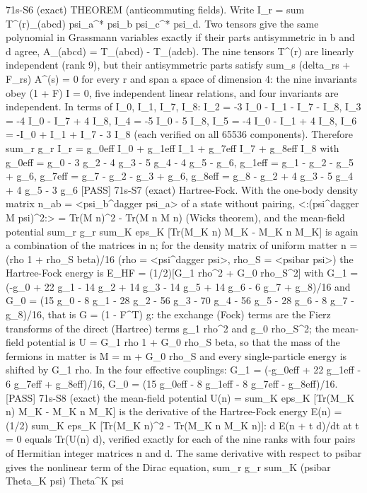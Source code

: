 \documentclass[
  10pt,
]{article}
\newenvironment{Shaded}{}{}
\newcommand{\NormalTok}[1]{#1}
\begin{document}
\begin{Shaded}
\begin{Highlighting}[]
\NormalTok{[PASS] 71s{-}S6  (exact) THEOREM (anticommuting fields). Write I\_r = sum T\^{}(r)\_(abcd) psi\_a\^{}* psi\_b psi\_c\^{}* psi\_d. Two tensors give the same polynomial in Grassmann variables exactly if their parts antisymmetric in b and d agree, A\_(abcd) = T\_(abcd) {-} T\_(adcb). The nine tensors T\^{}(r) are linearly independent (rank 9), but their antisymmetric parts satisfy sum\_s (delta\_rs + F\_rs) A\^{}(s) = 0 for every r and span a space of dimension 4: the nine invariants obey (1 + F) I = 0, five independent linear relations, and four invariants are independent. In terms of I\_0, I\_1, I\_7, I\_8: I\_2 = {-}3 I\_0 {-} I\_1 {-} I\_7 {-} I\_8, I\_3 = {-}4 I\_0 {-} I\_7 + 4 I\_8, I\_4 = {-}5 I\_0 {-} 5 I\_8, I\_5 = {-}4 I\_0 {-} I\_1 + 4 I\_8, I\_6 = {-}I\_0 + I\_1 + I\_7 {-} 3 I\_8 (each verified on all 65536 components). Therefore sum\_r g\_r I\_r = g\_0eff I\_0 + g\_1eff I\_1 + g\_7eff I\_7 + g\_8eff I\_8 with g\_0eff = g\_0 {-} 3 g\_2 {-} 4 g\_3 {-} 5 g\_4 {-} 4 g\_5 {-} g\_6, g\_1eff = g\_1 {-} g\_2 {-} g\_5 + g\_6, g\_7eff = g\_7 {-} g\_2 {-} g\_3 + g\_6, g\_8eff = g\_8 {-} g\_2 + 4 g\_3 {-} 5 g\_4 + 4 g\_5 {-} 3 g\_6}
\NormalTok{[PASS] 71s{-}S7  (exact) Hartree{-}Fock. With the one{-}body density matrix n\_ab = \textless{}psi\_b\^{}dagger psi\_a\textgreater{} of a state without pairing, \textless{}:(psi\^{}dagger M psi)\^{}2:\textgreater{} = Tr(M n)\^{}2 {-} Tr(M n M n) (Wick\textquotesingle{}s theorem), and the mean{-}field potential sum\_r g\_r sum\_K eps\_K [Tr(M\_K n) M\_K {-} M\_K n M\_K] is again a combination of the matrices in n; for the density matrix of uniform matter n = (rho 1 + rho\_S beta)/16 (rho = \textless{}psi\^{}dagger psi\textgreater{}, rho\_S = \textless{}psibar psi\textgreater{}) the Hartree{-}Fock energy is E\_HF = (1/2)[G\_1 rho\^{}2 + G\_0 rho\_S\^{}2] with G\_1 = ({-}g\_0 + 22 g\_1 {-} 14 g\_2 + 14 g\_3 {-} 14 g\_5 + 14 g\_6 {-} 6 g\_7 + g\_8)/16 and G\_0 = (15 g\_0 {-} 8 g\_1 {-} 28 g\_2 {-} 56 g\_3 {-} 70 g\_4 {-} 56 g\_5 {-} 28 g\_6 {-} 8 g\_7 {-} g\_8)/16, that is G = (1 {-} F\^{}T) g: the exchange (Fock) terms are the Fierz transforms of the direct (Hartree) terms g\_1 rho\^{}2 and g\_0 rho\_S\^{}2; the mean{-}field potential is U = G\_1 rho 1 + G\_0 rho\_S beta, so that the mass of the fermions in matter is M = m + G\_0 rho\_S and every single{-}particle energy is shifted by G\_1 rho. In the four effective couplings: G\_1 = ({-}g\_0eff + 22 g\_1eff {-} 6 g\_7eff + g\_8eff)/16, G\_0 = (15 g\_0eff {-} 8 g\_1eff {-} 8 g\_7eff {-} g\_8eff)/16.}
\NormalTok{[PASS] 71s{-}S8  (exact) the mean{-}field potential U(n) = sum\_K eps\_K [Tr(M\_K n) M\_K {-} M\_K n M\_K] is the derivative of the Hartree{-}Fock energy E(n) = (1/2) sum\_K eps\_K [Tr(M\_K n)\^{}2 {-} Tr(M\_K n M\_K n)]: d E(n + t d)/dt at t = 0 equals Tr(U(n) d), verified exactly for each of the nine ranks with four pairs of Hermitian integer matrices n and d. The same derivative with respect to psibar gives the nonlinear term of the Dirac equation, sum\_r g\_r sum\_K (psibar Theta\_K psi) Theta\^{}K psi}

\end{Highlighting}
\end{Shaded}
\end{document}
